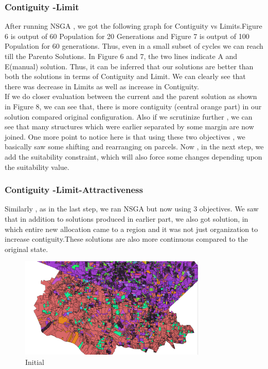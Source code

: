 \documentclass[12pt]{article} %
\begin{document}
\subsubsection{Contiguity -Limit}
After running NSGA , we got the following graph for Contiguity vs Limits.Figure 6 is output of 60 Population for 20 Generations and Figure 7 is output of 100 Population for 60 generations. Thus, even in a small subset of cycles we can reach till the Parento Solutions. In Figure 6 and 7, the two lines indicate A and E(manual) solution. Thus, it can be inferred that our solutions are better than both the solutions in terms of Contiguity and Limit. We can clearly see that there was decrease in Limits as well as increase in Contiguity.\\
If we do closer evaluation between the current and the parent solution as shown in Figure 8, we can see that, there is more contiguity (central orange part) in our solution compared original configuration. Also if we scrutinize further , we can see that many structures which were earlier separated by some margin are now joined. One more point to notice here is that using these two objectives , we basically saw some shifting and rearranging on parcels. Now , in the next step, we add the suitability constraint, which will also force some changes depending upon the suitability value. \\
\subsubsection{Contiguity -Limit-Attractiveness}
Similarly , as in the last step, we ran NSGA but now using 3 objectives. We saw that in addition to solutions produced in earlier part, we also got solution, in which entire new allocation came to a region and it was not just organization to increase contiguity.These solutions are also more continuous compared to the original state.
\begin{figure}[h]
\begin{center}
\includegraphics[width=3.5in]{orig1.png}
\caption{Initial}
\end{center}
\end{figure}
\end{document}
